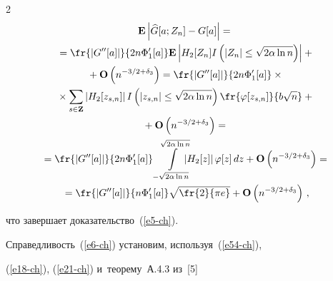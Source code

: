 \begin{multicols}{2}
\begin{multline*}
 \mathbf{E}\left|\widehat{G}[a;Z_n]-G[a]\right|={}\\


 {}=\fr{|G''[a]|}{2n\Phi'_1 [a]}


  \mathbf{E}\left|H_2[Z_n]


   I\left(|Z_n|\le \sqrt{2\alpha\ln n} \right)\right|


    +{}\\


    {}+ \mathbf{O}\left( {n^{- 3/2+\delta_3} } \right)=


    \fr{|G''[a]|}{2n\Phi'_1 [a]} \times{}\\


    {}\times


    \sum\limits_{s\in \mathbf{Z}}


   \left|H_2[z_{s,n}] \right|  I\left(|z_{s,n}|\le \sqrt{2\alpha\ln n} \right)


   \fr{\varphi[z_{s,n}]}{b\sqrt{n}}


    + {}\\


    {}+\mathbf{O}\left( {n^{- 3/2+\delta_3} } \right)={}


    \\ 


{}   =\fr{|G''[a]|}{2n\Phi'_1 [a]}


   \int\limits_{-\sqrt{2\alpha\ln n} }^{\sqrt{2\alpha\ln n}}\hspace*{-3mm}


   \left|H_2[z] \right| \varphi[z]\, dz


   + \mathbf{O}\left( {n^{- 3/2+\delta_3} } \right)


   ={}\\


   {}=\fr{|G''[a]|}{n\Phi'_1 [a]}\sqrt{\fr{2}{\pi e}}


    + \mathbf{O}\left( {n^{- 3/2+\delta_3} } \right)\,,


  \end{multline*}


   что завершает доказательство~(\ref{e5-ch}).


   







   Справедливость~(\ref{e6-ch}) установим, используя~(\ref{e54-ch}), 


   (\ref{e18-ch}), (\ref{e21-ch}) и~теорему~А.4.3 из~[5]



\end{multicols}
